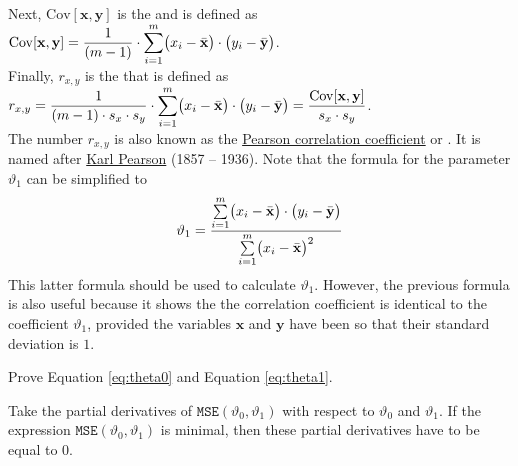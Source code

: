 \\[0.2cm]
Next, $\mathrm{Cov}[\mathbf{x}, \mathbf{y}]$ is the   and is defined as 
\\[0.2cm]
\hspace*{1.3cm}
$\displaystyle \mathrm{Cov}[\mathbf{x}, \mathbf{y}] = \frac{1}{(m-1)} \cdot \sum\limits_{i=1}^m \bigl(x_i - \bar{\mathbf{x}}\bigr) \cdot \bigl(y_i - \bar{\mathbf{y}}\bigr)$.
\\[0.2cm]
Finally, $r_{x,y}$ is the   that is
defined as 
\\[0.2cm]
\hspace*{1.3cm}
$\displaystyle r_{x,y} = \frac{1}{(m-1) \cdot s_x \cdot s_y} \cdot \sum\limits_{i=1}^m \bigl(x_i - \bar{\mathbf{x}}\bigr) \cdot \bigl(y_i - \bar{\mathbf{y}}\bigr)
            = \frac{\mathrm{Cov}[\mathbf{x}, \mathbf{y}]}{s_x \cdot s_y}
$.
\\[0.2cm]
The number $r_{x,y}$ is also known as the
\href{https://en.wikipedia.org/wiki/Pearson_correlation_coefficient}{Pearson correlation coefficient} 
 or 
.  It is named after \href{https://en.wikipedia.org/wiki/Karl_Pearson}{Karl Pearson}
(1857 -- 1936).
Note that the formula for the parameter $\vartheta_1$ can be simplified to  
\begin{equation}
  \label{eq:theta1}
\displaystyle\vartheta_1 = \frac{\sum\limits_{i=1}^m \bigl(x_i - \bar{\mathbf{x}}\bigr) \cdot \bigl(y_i - \bar{\mathbf{y}}\bigr)}{
                        \sum\limits_{i=1}^m \bigl(x_i - \bar{\mathbf{x}}\bigr)^2}  
\end{equation}
This latter formula should be used to calculate $\vartheta_1$.  However, the previous formula is also useful
because it shows the the correlation coefficient is identical to the coefficient $\vartheta_1$, provided the variables $\mathbf{x}$ and
$\mathbf{y}$ have been  so that their standard deviation is $1$.

\exercise
Prove Equation \ref{eq:theta0} and Equation \ref{eq:theta1}.

\hint
Take the partial derivatives of $\mathtt{MSE}(\vartheta_0, \vartheta_1)$ with respect to $\vartheta_0$ and
$\vartheta_1$.  If the expression  $\mathtt{MSE}(\vartheta_0, \vartheta_1)$ is minimal, then these partial
derivatives have to be equal to $0$.
\eox

